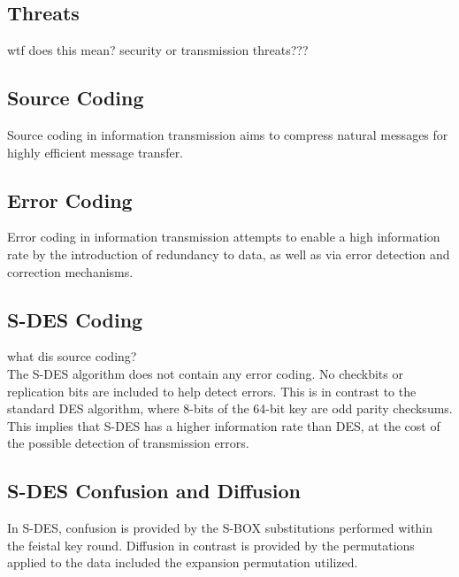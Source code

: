 \documentclass[]{article}
\begin{document}
\vspace*{0.8cm}
\subsection*{Threats}

wtf does this mean? security or transmission threats???

\subsection*{Source Coding}

Source coding in information transmission aims to compress natural messages for highly efficient message transfer.

\subsection*{Error Coding}

Error coding in information transmission attempts to enable a high information rate by the introduction of redundancy to data, as well as via error detection and correction mechanisms.

\subsection*{S-DES Coding}

what dis source coding? \\

The S-DES algorithm does not contain any error coding. No checkbits or replication bits are included to help detect errors. This is in contrast to the standard DES algorithm, where 8-bits of the 64-bit key are odd parity checksums. This implies that S-DES has a higher information rate than DES, at the cost of the possible detection of transmission errors.

\subsection*{S-DES Confusion and Diffusion}

In S-DES, confusion is provided by the S-BOX substitutions performed within the feistal key round. Diffusion in contrast is provided by the permutations applied to the data included the expansion permutation utilized.

\pagebreak

\end{document}
